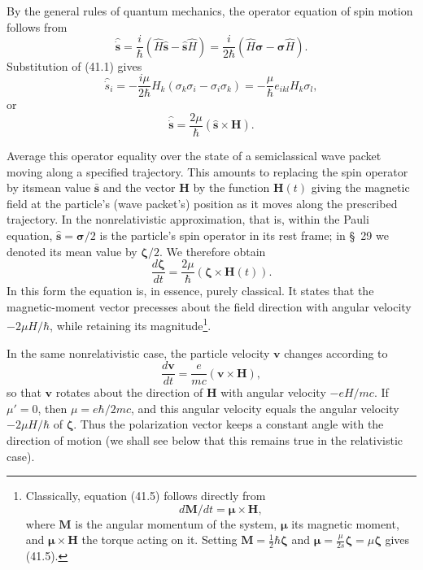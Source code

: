 By the general rules of quantum mechanics, the operator equation of spin motion follows from
\begin{equation}
\hat{\dot{\mathbf s}}=\frac i\hbar(\widehat H\hat{\mathbf s}-\hat{\mathbf s}\widehat H)
=\frac i{2\hbar}(\widehat H\boldsymbol\sigma-\boldsymbol\sigma\widehat H).
\tag{41.3}
\end{equation}
Substitution of (41.1) gives
\[
\hat{\dot s}_i=-\frac{i\mu}{2\hbar}H_k(\sigma_k\sigma_i-\sigma_i\sigma_k)
=-\frac\mu\hbar e_{ikl}H_k\sigma_l,
\]
or
\begin{equation}
\hat{\dot{\mathbf s}}=\frac{2\mu}{\hbar}(\hat{\mathbf s}\times\mathbf H).
\tag{41.4}
\end{equation}

Average this operator equality over the state of a semiclassical wave packet moving along a specified trajectory. This amounts to replacing the spin operator by itsmean value $\bar{\mathbf s}$ and the vector $\mathbf H$ by the function $\mathbf H(t)$ giving the magnetic field at the particle's (wave packet's) position as it moves along the prescribed trajectory. In the nonrelativistic approximation, that is, within the Pauli equation, $\hat{\mathbf s}=\boldsymbol\sigma/2$ is the particle's spin operator in its rest frame; in \S~29 we denoted its mean value by $\boldsymbol\zeta/2$. We therefore obtain
\begin{equation}
\frac{d\boldsymbol\zeta}{dt}=\frac{2\mu}{\hbar}(\boldsymbol\zeta\times\mathbf H(t)).
\tag{41.5}
\end{equation}
In this form the equation is, in essence, purely classical. It states that the magnetic-moment vector precesses about the field direction with angular velocity $-2\mu H/\hbar$, while retaining its magnitude\footnote{Classically, equation (41.5) follows directly from
\[
d\mathbf M/dt=\boldsymbol\mu\times\mathbf H,
\]
where $\mathbf M$ is the angular momentum of the system, $\boldsymbol\mu$ its magnetic moment, and $\boldsymbol\mu\times\mathbf H$ the torque acting on it. Setting $\mathbf M=\tfrac12\hbar\boldsymbol\zeta$ and $\boldsymbol\mu=\tfrac{\mu}{2s}\boldsymbol\zeta=\mu\boldsymbol\zeta$ gives (41.5).}.

In the same nonrelativistic case, the particle velocity $\mathbf v$ changes according to
\[
\frac{d\mathbf v}{dt}=\frac e{mc}(\mathbf v\times\mathbf H),
\]
so that $\mathbf v$ rotates about the direction of $\mathbf H$ with angular velocity $-eH/mc$. If $\mu'=0$, then $\mu=e\hbar/2mc$, and this angular velocity equals the angular velocity $-2\mu H/\hbar$ of $\boldsymbol\zeta$. Thus the polarization vector keeps a constant angle with the direction of motion (we shall see below that this remains true in the relativistic case).

